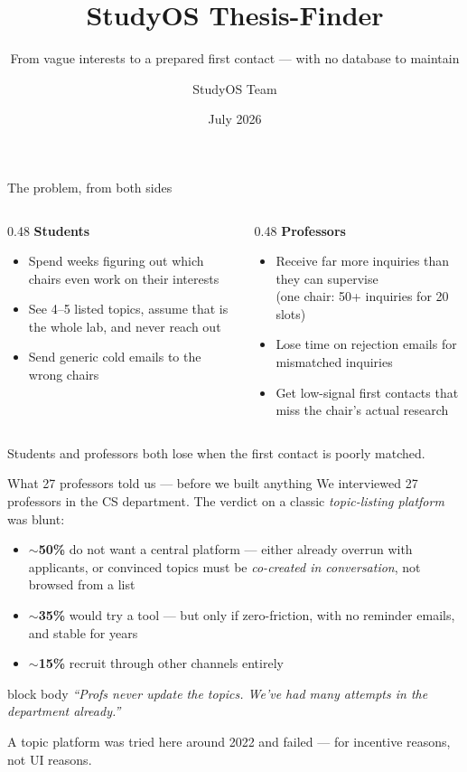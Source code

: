\documentclass[11pt,aspectratio=169]{beamer}
\title{StudyOS Thesis-Finder}
\subtitle{From vague interests to a prepared first contact --- with no database to maintain}
\author{StudyOS Team}
\institute{Department of Computer Science, University of Tübingen}
\date{July 2026}
\newcommand{\quotebox}[1]{%
  \begin{beamercolorbox}[rounded=true,sep=0.6em]{block body}%
    \itshape #1%
  \end{beamercolorbox}}
\begin{document}
\maketitle

\begin{frame}{The problem, from both sides}
  \begin{columns}[T]
    \begin{column}{0.48\textwidth}
      \textbf{Students}
      \begin{itemize}
        \item Spend weeks figuring out which chairs even work on their interests
        \item See 4--5 listed topics, assume that is the whole lab, and never reach out
        \item Send generic cold emails to the wrong chairs
      \end{itemize}
    \end{column}
    \begin{column}{0.48\textwidth}
      \textbf{Professors}
      \begin{itemize}
        \item Receive far more inquiries than they can supervise \\ (one chair: 50+ inquiries for 20 slots)
        \item Lose time on rejection emails for mismatched inquiries
        \item Get low-signal first contacts that miss the chair's actual research
      \end{itemize}
    \end{column}
  \end{columns}
  \vspace{1em}
  \begin{center}
    \alert{Students and professors both lose when the first contact is poorly matched.}
  \end{center}
\end{frame}

\begin{frame}{What 27 professors told us --- before we built anything}
  We interviewed 27 professors in the CS department. The verdict on a classic
  \emph{topic-listing platform} was blunt:
  \begin{itemize}
    \item \textbf{$\sim$50\%} do not want a central platform --- either already
      overrun with applicants, or convinced topics must be
      \emph{co-created in conversation}, not browsed from a list
    \item \textbf{$\sim$35\%} would try a tool --- but only if zero-friction,
      with no reminder emails, and stable for years
    \item \textbf{$\sim$15\%} recruit through other channels entirely
  \end{itemize}
  \quotebox{``Profs never update the topics. We've had many attempts in the
  department already.''}

  A topic platform was tried here around 2022 and failed --- for
  \alert{incentive} reasons, not UI reasons.
\end{frame}
\end{document}

